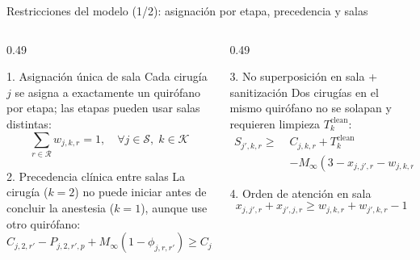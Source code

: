 \documentclass[aspectratio=169,11pt]{beamer}
\begin{document}
\begin{frame}{Restricciones del modelo (1/2): asignación por etapa, precedencia y salas}
  \begin{columns}[t]
    \begin{column}{0.49\textwidth}
      \begin{block}{1. Asignación única de sala}
        Cada cirugía $j$ se asigna a exactamente un quirófano por etapa; las etapas pueden usar salas distintas:
        \begin{equation*}
          \sum_{r \in \mathcal{R}} w_{j,k,r} = 1, \quad \forall j \in \mathcal{S},\; k \in \mathcal{K}
        \end{equation*}
      \end{block}

      \begin{block}{2. Precedencia clínica entre salas}
        La cirugía ($k=2$) no puede iniciar antes de concluir la anestesia ($k=1$), aunque use otro quirófano:
        \scriptsize
        \begin{equation*}
          C_{j,2,r'} - P_{j,2,r',p} + M_{\infty}(1 - \phi_{j,r,r'}) \ge C_{j,1,r}
        \end{equation*}
      \end{block}
    \end{column}

    \begin{column}{0.49\textwidth}
      \begin{block}{3. No superposición en sala + sanitización}
        Dos cirugías en el mismo quirófano no se solapan y requieren limpieza $T^{\text{clean}}_k$:
        \scriptsize
        \begin{equation*}
          \begin{split}
            S_{j',k,r} \ge \; & C_{j,k,r} + T^{\text{clean}}_k \\
            & - M_{\infty}(3 - x_{j,j',r} - w_{j,k,r} - w_{j',k,r})
          \end{split}
        \end{equation*}
      \end{block}

      \begin{block}{4. Orden de atención en sala}
        \small
        \begin{equation*}
          x_{j,j',r} + x_{j',j,r} \ge w_{j,k,r} + w_{j',k,r} - 1
        \end{equation*}
      \end{block}
    \end{column}
  \end{columns}
\end{frame}
\end{document}
